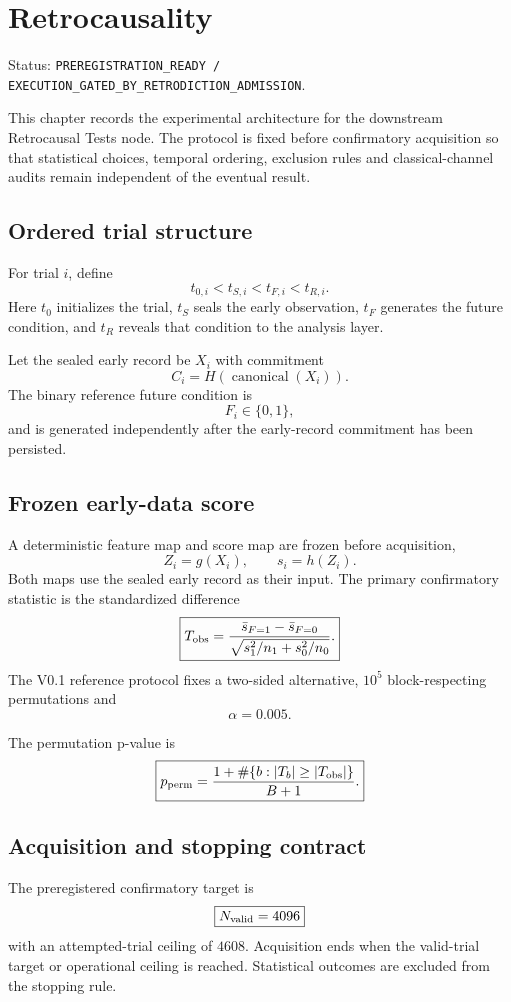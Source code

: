 \chapter{Retrocausality}

Status: \texttt{PREREGISTRATION\_READY / EXECUTION\_GATED\_BY\_RETRODICTION\_ADMISSION}.

This chapter records the experimental architecture for the downstream Retrocausal Tests node. The protocol is fixed before confirmatory acquisition so that statistical choices, temporal ordering, exclusion rules and classical-channel audits remain independent of the eventual result.

\section{Ordered trial structure}

For trial $i$, define
\[
\boxed{t_{0,i}<t_{S,i}<t_{F,i}<t_{R,i}.}
\]
Here $t_0$ initializes the trial, $t_S$ seals the early observation, $t_F$ generates the future condition, and $t_R$ reveals that condition to the analysis layer.

Let the sealed early record be $X_i$ with commitment
\[
\boxed{C_i=H(\operatorname{canonical}(X_i)).}
\]
The binary reference future condition is
\[
F_i\in\{0,1\},
\]
and is generated independently after the early-record commitment has been persisted.

\section{Frozen early-data score}

A deterministic feature map and score map are frozen before acquisition,
\[
Z_i=g(X_i),
\qquad
s_i=h(Z_i).
\]
Both maps use the sealed early record as their input. The primary confirmatory statistic is the standardized difference
\[
\boxed{
T_{\rm obs}
=\frac{\bar s_{F=1}-\bar s_{F=0}}
{\sqrt{s_1^2/n_1+s_0^2/n_0}}.
}
\]
The V0.1 reference protocol fixes a two-sided alternative, $10^5$ block-respecting permutations and
\[
\boxed{\alpha=0.005.}
\]

The permutation p-value is
\[
\boxed{
p_{\rm perm}
=\frac{1+\#\{b:|T_b|\ge |T_{\rm obs}|\}}
{B+1}.
}
\]

\section{Acquisition and stopping contract}

The preregistered confirmatory target is
\[
\boxed{N_{\rm valid}=4096}
\]
with an attempted-trial ceiling of $4608$. Acquisition ends when the valid-trial target or operational ceiling is reached. Statistical outcomes are excluded from the stopping rule.

